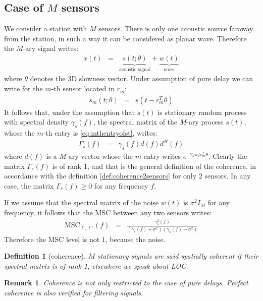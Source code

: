 \documentclass[a4paper, 12pt]{report}
\newtheorem{remark}{Remark}
\newtheorem{definition}{Definition}
\def\MSC{\mathrm{MSC}}
\begin{document}
\subsection{Case of $M$ sensors}
We consider a station with $M$ sensors. There is only one acoustic source faraway from the station, in such a way it can be considered as planar wave. Therefore the $M$-ary signal  writes: 
\begin{eqnarray*}
x(t) & = & \underbrace{s(t;\theta)}_{\text{acoustic signal}}+ \underbrace{w(t)}_{\text{noise}}
\end{eqnarray*}
where $\theta$ denotes the 3D slowness vector. Under assumption of pure delay we can write for the $m$-th sensor located in $r_{m}$:
\begin{eqnarray}
\label{eq:mthentryofst}
s_{m}(t;\theta)&=&s(t-r_{m}^{T}\theta)
\end{eqnarray}
It follows  that, under the assumption  that $s(t)$ is stationary random process with spectral density $\gamma_{s}(f)$, the spectral matrix of the $M$-ary process $s(t)$, whose the $m$-th entry is \eqref{eq:mthentryofst}, writes:
\begin{eqnarray*}
\Gamma_{s}(f)&=&\gamma_{s}(f)d(f)d^{H}(f)
\end{eqnarray*}
where $d(f)$ is a $M$-ary vector whose the $m$-entry writes $e^{-2j\pi fr_{m}^{T}\theta}$. Clearly the matrix $\Gamma_{s}(f)$ is of rank 1, and that is the general definition of the coherence, in accordance with the definition \ref{def:coherence2sensors} for only 2 sensors. In any case, the matrix $\Gamma_{s}(f)\geq 0$ for any frequency $f$.

If we assume that the spectral matrix of the noise $w(t)$ is $\sigma^{2}I_M$ for any frequency, it follows that the MSC between any two sensors writes:
\begin{eqnarray*}
 \MSC_{\ell,\ell'}(f)&=& \frac{\gamma_{s}^{2}(f)}{(\gamma_{s}(f)+\sigma^{2})(\gamma_{s}(f)+\sigma^{2})}
\end{eqnarray*}
Therefore the MSC level is not $1$, because the noise.

\begin{definition}[coherence]
\label{def:coherenceMsensors}
$M$ stationary signals are said spatially coherent if their spectral matrix is of rank 1, elsewhere we speak about LOC. 
\end{definition}

\begin{remark}
Coherence is not only restricted to the case of pure delays. Perfect coherence is also verified for filtering signals.
\end{remark}
\end{document}
